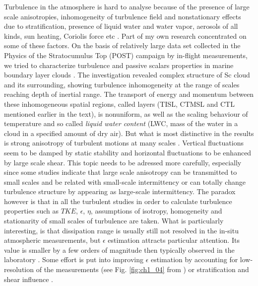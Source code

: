\documentclass[../main.tex]{subfiles}
\begin{document}
Turbulence in the atmosphere is hard to analyse because of the presence of large scale anisotropies, inhomogeneity of turbulence field and nonstationary effects due to stratification, presence of liquid water and water vapor, aerosols of all kinds, sun heating, Coriolis force etc \citep{Wyngaard2010}. Part of my own research concentrated on some of these factors. On the basis of relatively large data set collected in the Physics of the Stratocumulus Top (POST) campaign by in-flight measurements, we tried to characterize turbulence and passive scalars properties in marine boundary layer clouds \citep{Jen-LaPlante2016, Ma2017}. The investigation revealed complex structure of Sc cloud and its surrounding, showing turbulence inhomogeneity at the range of scales reaching depth of inertial range. The transport of energy and momentum between these inhomogeneous spatial regions, called layers (TISL, CTMSL and CTL mentioned earlier in the text), is nonuniform, as well as the scaling behaviour of temperature and so called \emph{liquid water content} (LWC, mass of the water in a cloud in a specified amount of dry air). But what is most distinctive in the results is strong anisotropy of turbulent motions at many scales \citep{Pedersen2018}. Vertical fluctuations seem to be damped by static stability and horizontal fluctuations to be enhanced by large scale shear. This topic needs to be adressed more carefully, especially since some studies indicate that large scale anisotropy can be transmitted to small scales and be related with small-scale intermittency \citep{Warhaft2002} or can totally change turbulence structure by appearing as large-scale intermittency\citep{Takahashi2018}. The paradox however is that in all the turbulent studies in order to calculate turbulence properties such as $TKE$, $\epsilon$, $\eta$, assumptions of isotropy, homogeneity and stationarity of small scales of turbulence are taken. What is particularly interesting, is that dissipation range is usually still not resolved in the in-situ atmospheric measurements, but $\epsilon$ estimation attracts particular attention. Its value is smaller by a few orders of magnitude then typically observed in the laboratory \citep{Siebert2009, Jen-LaPlante2016}. Some effort is put into improving $\epsilon$ estimation by accounting for low-resolution of the measurements (see Fig. \ref{fig:ch1_04} from \citet{Waclawczyk2017}) or stratification and shear influence \citep{Zilitinkevich2019}. \\
\end{document}
